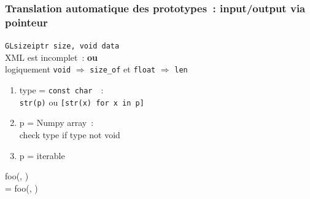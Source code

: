 \begin{frame}
  \frametitle{Translation automatique des prototypes~: input/output via pointeur}
  \texttt{GLsizeiptr size,  void  data} \\[.5em]
  \attention{} \alert{XML est incomplet~:  \textbf{ou} } \\
  logiquement \texttt{void} $\Longrightarrow$ \texttt{size\_of} et \texttt{float} $\Longrightarrow$ \texttt{len}
  \vspace{.5em}
  \begin{enumerate}
  \item type = \texttt{const char \ptr\ptr}~:\\
    \texttt{str(p)} ou \texttt{[str(x) for x in p]}
  \item p = Numpy array~:\\
    check type if type not void
  \item p = iterable
  \end{enumerate}
  \vspace{.5em}
   foo(, ) \\
   = foo(, )
  \note{
    \begin{enumerate}
    \item 
    \end{enumerate}
  }
\end{frame}

